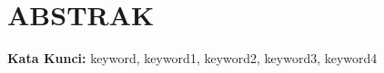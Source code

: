 \chapter{ABSTRAK}
\noindent\lipsum[1]

\vspace{11pt}

\textbf{Kata Kunci:} keyword, keyword1, keyword2, keyword3, keyword4
